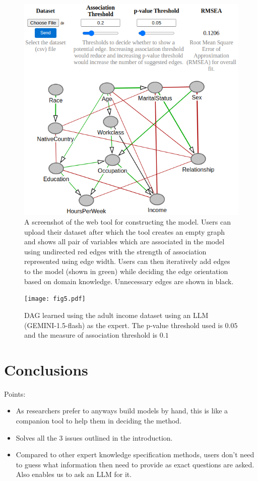 \documentclass{uai2025} %
\begin{document}
\begin{figure}[t!]
	\centering
	\includegraphics[scale=0.4]{../code/plots/web_tool_full_new.png}
	\caption{A screenshot of the web tool for constructing the model. Users
		can upload their dataset after which the tool creates an empty
		graph and shows all pair of variables which are associated in
		the model using undirected red edges with the strength of
		association represented using edge width. Users can then
		iteratively add edges to the model (shown in green) while
		deciding the edge orientation based on domain knowledge.
		Unnecessary edges are shown in black.}
	\label{fig:web}
\end{figure}

\begin{figure}[t!]
	\centering
	\texttt{[image: fig5.pdf]}
	\caption{DAG learned using the adult income dataset using an LLM (GEMINI-1.5-flash) as the expert. The p-value threshold used is $ 0.05 $ and the measure of association threshold is $ 0. 1 $}
	\label{fig:adult_llm}
\end{figure}

\section{Conclusions}

Points:
\begin{itemize}
	\item As researchers prefer to anyways build models by hand, this is like a companion tool to help them in deciding the method.
	\item Solves all the $ 3 $ issues outlined in the introduction.
	\item Compared to other expert knowledge specification methods, users don't need to guess what information then need to provide as exact questions are asked. Also enables us to ask an LLM for it.
\end{itemize}
\end{document}
